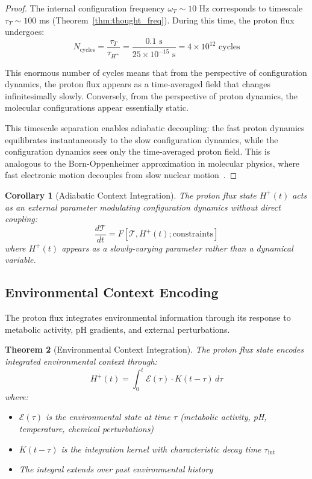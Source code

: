 \documentclass[aps,prd,twocolumn,superscriptaddress,floatfix,nofootinbib]{revtex4-2}
\newtheorem{theorem}{Theorem}[section]
\newtheorem{corollary}[theorem]{Corollary}
\theoremstyle{remark}
\begin{document}
\begin{proof}
The internal configuration frequency $\omega_T \sim 10$ Hz corresponds to timescale $\tau_T \sim 100$ ms (Theorem~\ref{thm:thought_freq}). During this time, the proton flux undergoes:
$$
N_{\text{cycles}} = \frac{\tau_T}{\tau_{H^+}} = \frac{0.1 \text{ s}}{25 \times 10^{-15} \text{ s}} = 4 \times 10^{12} \text{ cycles}
$$

This enormous number of cycles means that from the perspective of configuration dynamics, the proton flux appears as a time-averaged field that changes infinitesimally slowly. Conversely, from the perspective of proton dynamics, the molecular configurations appear essentially static.

This timescale separation enables adiabatic decoupling: the fast proton dynamics equilibrates instantaneously to the slow configuration dynamics, while the configuration dynamics sees only the time-averaged proton field. This is analogous to the Born-Oppenheimer approximation in molecular physics, where fast electronic motion decouples from slow nuclear motion~\cite{born1927quantentheorie}.
\end{proof}

\begin{corollary}[Adiabatic Context Integration]
\label{cor:adiabatic}
The proton flux state $H^+(t)$ acts as an external parameter modulating configuration dynamics without direct coupling:
\begin{equation}
\frac{d\mathcal{T}}{dt} = F[\mathcal{T}, H^+(t); \text{constraints}]
\end{equation}
where $H^+(t)$ appears as a slowly-varying parameter rather than a dynamical variable.
\end{corollary}

\subsection{Environmental Context Encoding}

The proton flux integrates environmental information through its response to metabolic activity, pH gradients, and external perturbations.

\begin{theorem}[Environmental Context Integration]
\label{thm:emotion_thermometer}
The proton flux state encodes integrated environmental context through:
\begin{equation}
H^+(t) = \int_0^t \mathcal{E}(\tau) \cdot K(t - \tau) \, d\tau
\end{equation}
where:
\begin{itemize}
\item $\mathcal{E}(\tau)$ is the environmental state at time $\tau$ (metabolic activity, pH, temperature, chemical perturbations)
\item $K(t - \tau)$ is the integration kernel with characteristic decay time $\tau_{\text{int}}$
\item The integral extends over past environmental history
\end{itemize}
\end{theorem}
\end{document}
